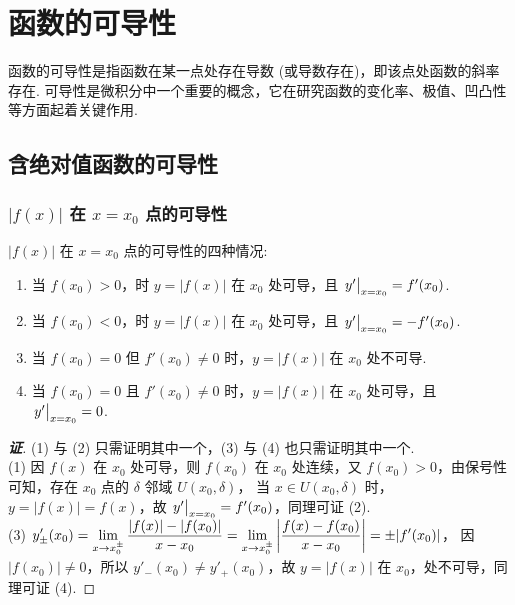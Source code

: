 \section{函数的可导性}

函数的可导性是指函数在某一点处存在导数 (或导数存在)，即该点处函数的斜率存在. 
可导性是微积分中一个重要的概念，它在研究函数的变化率、极值、凹凸性等方面起着关键作用.

\subsection{含绝对值函数的可导性}

\subsubsection{\texorpdfstring{$|f(x)|$}. 在 \texorpdfstring{$x=x_0$}. 点的可导性}

\begin{theorem}[含绝对值函数的可导性]
    $ |f(x)| $ 在 $x=x_0$ 点的可导性的四种情况:\label{thereAreFourCasesOfDerivability}
    \begin{enumerate}[label=(\arabic{*})]
        \item 当 $f(x_0)>0$，时 $y=|f(x)|$ 在 $x_0$ 处可导，且 $\eval{y'}_{x=x_0}=f'(x_0)$.
        \item 当 $f(x_0)<0$，时 $y=|f(x)|$ 在 $x_0$ 处可导，且 $\eval{y'}_{x=x_0}=-f'(x_0)$.
        \item 当 $f(x_0)=0$ 但 $f'(x_0)\neq0$ 时，$y=|f(x)|$ 在 $x_0$ 处不可导.
        \item 当 $f(x_0)=0$ 且 $f'(x_0)\neq0$ 时，$y=|f(x)|$ 在 $x_0$ 处可导，且 $\eval{y'}_{x=x_0}=0$.
    \end{enumerate}
\end{theorem}
\begin{proof}[{\songti \textbf{证}}]
    (1) 与 (2) 只需证明其中一个，(3) 与 (4) 也只需证明其中一个.\\
    (1) 因 $f(x)$ 在 $x_0$ 处可导，则 $f(x_0)$ 在 $x_0$ 处连续，又 $f(x_0)>0$，由保号性可知，存在 $x_0$ 点的 $\delta$ 邻域 $U(x_0,\delta)$，
    当 $x\in U(x_0,\delta)$ 时，$y=|f(x)|=f(x)$，故 $\eval{y'}_{x=x_0}=f'(x_0)$，同理可证 (2).\\
    (3) $\displaystyle y'_{\pm}(x_0)=\lim_{x\to x_0^{\pm}}\dfrac{|f(x)|-|f(x_0)|}{x-x_0}=\lim_{x\to x_0^{\pm}}\qty|\dfrac{f(x)-f(x_0)}{x-x_0}|=\pm|f'(x_0)|$，
    因 $|f(x_0)|\neq0$，所以 $y'_-(x_0)\neq y'_+(x_0)$，故 $y=|f(x)|$ 在 $x_0$，处不可导，同理可证 (4).
\end{proof}

